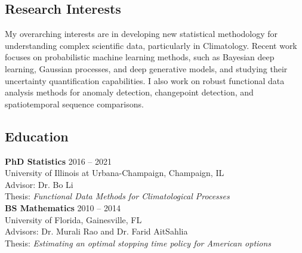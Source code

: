 \documentclass[11pt]{article}
\begin{document}
\subsection*{Research Interests}
\vspace{-0.6cm}\noindent\hrulefill
\vspace{0.2cm}

\noindent My overarching interests are in developing new statistical methodology for understanding complex scientific data, particularly in Climatology. Recent work focuses on probabilistic machine learning methods, such as Bayesian deep learning, Gaussian processes, and deep generative models, and studying their uncertainty quantification capabilities. I also work on robust functional data analysis methods for anomaly detection, changepoint detection, and spatiotemporal sequence comparisons. 





\subsection*{Education}
\vspace{-0.6cm}\noindent\hrulefill
\vspace{0.2cm}

\noindent \textbf{PhD Statistics} \hfill 2016 -- 2021 \\
University of Illinois at Urbana-Champaign, Champaign, IL \\
Advisor: Dr. Bo Li \\
Thesis: \textit{Functional Data Methods for Climatological Processes}\\

\noindent \textbf{BS Mathematics} \hfill 2010 -- 2014 \\
University of Florida, Gainesville, FL \\
Advisors: Dr. Murali Rao and Dr. Farid AitSahlia \\
Thesis: \textit{Estimating an optimal stopping time policy for American options}
\end{document}
